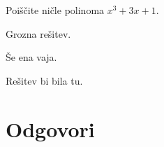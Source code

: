 \begin{vaja}
  Poiščite ničle polinoma $x^3 + 3 x + 1$.

  \begin{odgovor}
    Grozna rešitev.
  \end{odgovor}
\end{vaja}

\begin{vaja}
  Še ena vaja.

  \begin{odgovor}
    Rešitev bi bila tu.
  \end{odgovor}
\end{vaja}




\section{Odgovori}
\label{sec:polinomi-odgovori}




